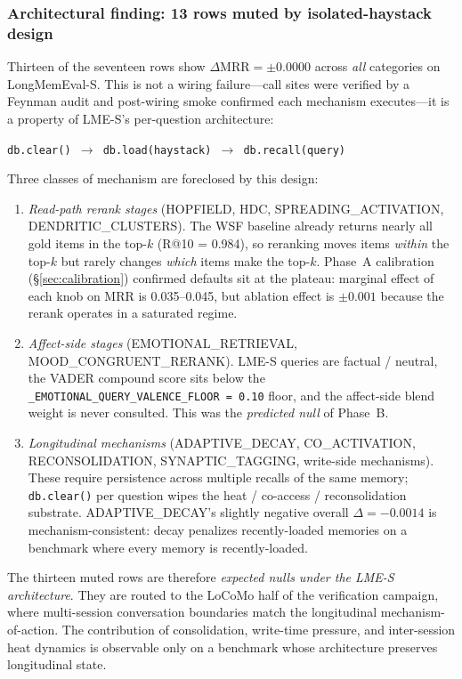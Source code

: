 \documentclass[11pt]{article}
\begin{document}
\subsubsection{Architectural finding: 13 rows muted by isolated-haystack design}
\label{sec:per-mech-architectural}

Thirteen of the seventeen rows show $\Delta\text{MRR} = \pm 0.0000$
across \emph{all} categories on LongMemEval-S.  This is not a wiring
failure---call sites were verified by a Feynman audit and post-wiring
smoke confirmed each mechanism executes---it is a property of LME-S's
per-question architecture:
\begin{center}
\texttt{db.clear() $\to$ db.load(haystack) $\to$ db.recall(query)}
\end{center}

Three classes of mechanism are foreclosed by this design:

\begin{enumerate}
\item \emph{Read-path rerank stages} (HOPFIELD, HDC,
  SPREADING\_ACTIVATION, DENDRITIC\_CLUSTERS).  The WSF baseline
  already returns nearly all gold items in the top-$k$
  (R@10 = 0.984), so reranking moves items \emph{within} the top-$k$
  but rarely changes \emph{which} items make the top-$k$.  Phase~A
  calibration (\S\ref{sec:calibration}) confirmed defaults sit at
  the plateau: marginal effect of each knob on MRR is
  0.035--0.045, but ablation effect is $\pm 0.001$ because the
  rerank operates in a saturated regime.
\item \emph{Affect-side stages} (EMOTIONAL\_RETRIEVAL,
  MOOD\_CONGRUENT\_RERANK).  LME-S queries are factual / neutral,
  the VADER compound score sits below the
  \texttt{\_EMOTIONAL\_QUERY\_VALENCE\_FLOOR = 0.10} floor, and the
  affect-side blend weight is never consulted.  This was the
  \emph{predicted null} of Phase~B.
\item \emph{Longitudinal mechanisms} (ADAPTIVE\_DECAY,
  CO\_ACTIVATION, RECONSOLIDATION, SYNAPTIC\_TAGGING, write-side
  mechanisms).  These require persistence across multiple recalls of
  the same memory; \texttt{db.clear()} per question wipes the heat /
  co-access / reconsolidation substrate.  ADAPTIVE\_DECAY's slightly
  negative overall $\Delta = -0.0014$ is mechanism-consistent: decay
  penalizes recently-loaded memories on a benchmark where every
  memory is recently-loaded.
\end{enumerate}

The thirteen muted rows are therefore \emph{expected nulls under the
LME-S architecture}.  They are routed to the LoCoMo half of the
verification campaign, where multi-session conversation boundaries
match the longitudinal mechanism-of-action.  The contribution of
consolidation, write-time pressure, and inter-session heat dynamics
is observable only on a benchmark whose architecture preserves
longitudinal state.
\end{document}
